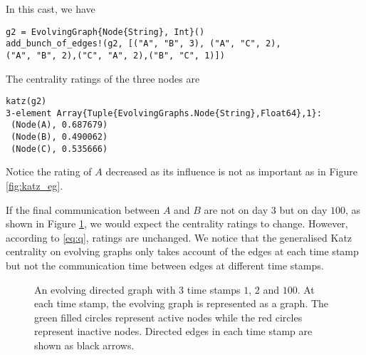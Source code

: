 \documentclass[12pt]{article}
\theoremstyle{definition}
\begin{document}
In this cast, we have
\begin{lstlisting}
g2 = EvolvingGraph{Node{String}, Int}()
add_bunch_of_edges!(g2, [("A", "B", 3), ("A", "C", 2),
("A", "B", 2),("C", "A", 2),("B", "C", 1)])
\end{lstlisting}

The centrality ratings of the three nodes are

\begin{lstlisting}
katz(g2)
3-element Array{Tuple{EvolvingGraphs.Node{String},Float64},1}:
 (Node(A), 0.687679)
 (Node(B), 0.490062)
 (Node(C), 0.535666)
\end{lstlisting}

Notice the rating of $A$ decreased as its influence is not as important as in Figure \ref{fig:katz_eg}.

If the final communication between $A$ and $B$ are not on day $3$ but on day $100$, as shown in Figure \ref{fig:katz_eg3},
we would expect the centrality ratings to change. However, according to \eqref{eq:q}, ratings are unchanged.
We notice that the generalised Katz centrality on evolving graphs only takes account of the edges at each time stamp but not the communication time between edges at different time stamps.


\begin{figure}[h]
 \begin{center}
\end{center}
\caption{An evolving directed graph with 3 time stamps $1$, $2$ and $100$.
At each time stamp, the evolving graph is represented as a graph.
The green filled circles represent active nodes while the red circles represent
inactive nodes. Directed edges in each time stamp are shown as black arrows.}
\label{fig:katz_eg3}
\end{figure}
\end{document}
